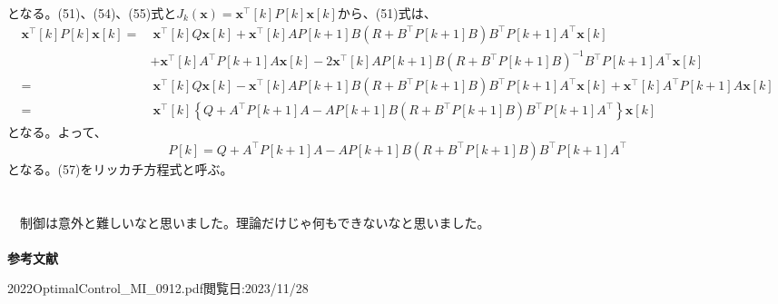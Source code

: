 \documentclass[a4paper,10.5pt]{ltjsarticle}
\begin{document}
となる。(51)、(54)、(55)式と$J_k(\bm x)=\bm x^\top[k]P[k]\bm x[k]$から、(51)式は、
\begin{align}
  \bm x^\top[k]P[k]\bm x[k]=&\ \bm x^\top[k]Q\bm x[k]+\bm x^\top[k]AP[k+1]B\left(R+B^\top P[k+1]B\right)B^\top P[k+1]A^\top\bm x[k]\hspace{70pt}\nonumber\\
  &+\bm x^\top[k]A^\top P[k+1]A\bm x[k]-2\bm x^\top[k]AP[k+1]B\left(R+B^\top P[k+1]B\right)^{-1}B^\top P[k+1]A^\top\bm x[k]\nonumber\\
  =&\ \bm x^\top[k]Q\bm x[k]-\bm x^\top[k]AP[k+1]B\left(R+B^\top P[k+1]B\right)B^\top P[k+1]A^\top\bm x[k]+\bm x^\top[k]A^\top P[k+1]A\bm x[k]\nonumber\\
  =&\ \bm x^\top[k]\left\{Q+A^\top P[k+1]A-AP[k+1]B\left(R+B^\top P[k+1]B\right)B^\top P[k+1]A^\top\right\}\bm x[k]
\end{align}
となる。よって、
\begin{equation}
  P[k]=Q+A^\top P[k+1]A-AP[k+1]B\left(R+B^\top P[k+1]B\right)B^\top P[k+1]A^\top
\end{equation}
となる。(57)をリッカチ方程式と呼ぶ。\\
\\
\hspace{-2pt}{\Large \bfseries 6.感想}\\
　制御は意外と難しいなと思いました。理論だけじゃ何もできないなと思いました。\\
\\
{\Large \bfseries 参考文献}
\begin{thebibliography}{1}
\vspace{-1.5cm}
   2022OptimalControl\_MI\_0912.pdf閲覧日:2023/11/28
\end{thebibliography}
\end{document}
